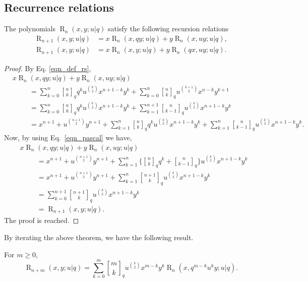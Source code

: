 \documentclass{cimart}
\newcommand{\qbinom}{\genfrac{[}{]}{0pt}{}}
\DeclareMathOperator{\opR}{R}
\begin{document}
\subsection{Recurrence relations}

\begin{theorem}
The polynomials $\opR_{n}(x,y;u|q)$ satisfy the following recursion relations
    \begin{align}
        \opR_{n+1}(x,y;u|q)&=x\opR_{n}(x,qy;u|q)+y\opR_{n}(x,uy;u|q),\\
        \opR_{n+1}(x,y;u|q)&=x\opR_{n}(x,y;u|q)+y\opR_{n}(qx,uy;u|q).
    \end{align}
\end{theorem}
\begin{proof}
By Eq. \eqref{eqn_def_rs},
\begin{align*}
    &x\opR_{n}(x,qy;u|q)+y\opR_{n}(x,uy;u|q)\\
    &\hspace{1cm}=\sum_{k=0}^{n}\qbinom{n}{k}_{q}q^ku^{\binom{k}{2}}x^{n+1-k}y^k+\sum_{k=0}^{n}\qbinom{n}{k}_{q}u^{\binom{k+1}{2}}x^{n-k}y^{k+1}\\
    &\hspace{1cm}=\sum_{k=0}^{n}\qbinom{n}{k}_{q}q^ku^{\binom{k}{2}}x^{n+1-k}y^k+\sum_{k=1}^{n+1}\qbinom{n}{k-1}_{q}u^{\binom{k}{2}}x^{n+1-k}y^{k}\\
    &\hspace{1cm}=x^{n+1}+u^{\binom{n+1}{2}}y^{n+1}+\sum_{k=1}^{n}\qbinom{n}{k}_{q}q^ku^{\binom{k}{2}}x^{n+1-k}y^k+\sum_{k=1}^{n}\qbinom{n}{k-1}_{q}u^{\binom{k}{2}}x^{n+1-k}y^{k}.
\end{align*}
Now, by using Eq.~\eqref{eqn_pascal} we have,
\begin{align*}
    &x\opR_{n}(x,qy;u|q)+y\opR_{n}(x,uy;u|q)\\
    &\hspace{1cm}=x^{n+1}+u^{\binom{n+1}{2}}y^{n+1}+\sum_{k=1}^{n}\bigg\{\qbinom{n}{k}_{q}q^k+\qbinom{n}{k-1}_{q}\bigg\}u^{\binom{k}{2}}x^{n+1-k}y^k\\
    &\hspace{1cm}=x^{n+1}+u^{\binom{n+1}{2}}y^{n+1}+\sum_{k=1}^{n}\qbinom{n+1}{k}_{q}u^{\binom{k}{2}}x^{n+1-k}y^k\\
    &\hspace{1cm}=\sum_{k=0}^{n+1}\qbinom{n+1}{k}_{q}u^{\binom{k}{2}}x^{n+1-k}y^k\\
    &\hspace{1cm}=\opR_{n+1}(x,y;u|q).
\end{align*}
The proof is reached.
\end{proof}
By iterating the above theorem, we have the following result.
\begin{theorem}
For $m\geq0$,
\begin{equation}
    \opR_{n+m}(x,y;u|q)=\sum_{k=0}^{m}\qbinom{m}{k}_{q}u^{\binom{k}{2}}x^{m-k}y^{k}\opR_{n}(x,q^{m-k}u^ky;u|q).
\end{equation}    
\end{theorem}
\end{document}
